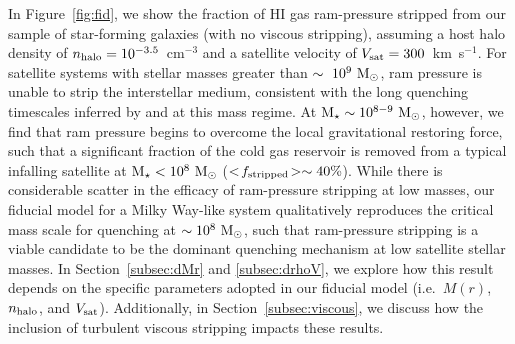 In Figure~\ref{fig:fid}, we show the fraction of H{\scriptsize I} gas
ram-pressure stripped from our sample of star-forming galaxies (with
no viscous stripping), assuming a host halo density of $n_{\rm halo} =
10^{-3.5}$~cm$^{-3}$ and a satellite velocity of $V_{\rm sat} =
300$~km~s$^{-1}$.
%
For satellite systems with stellar masses greater than
$\sim~10^{9}~{\rm M}_{\odot}$, ram pressure is unable to strip the interstellar
medium, consistent with the long quenching timescales inferred by
\citet{wheeler14} and \citet{fham15} at this mass regime.
% 
At ${\rm M}_{\star} \sim 10^{8-9}~{\rm M}_{\odot}$, however, we find that ram pressure
begins to overcome the local gravitational restoring force, such that
a significant fraction of the cold gas reservoir is removed from a
typical infalling satellite at ${\rm M}_{\star} < 10^{8}~{\rm M}_{\odot}$ ($<\!f_{\rm
  stripped}\!> \sim 40\%$).
%
While there is considerable scatter in the efficacy of ram-pressure
stripping at low masses, our fiducial model for a Milky Way-like
system qualitatively reproduces the critical mass scale for quenching
at $\sim10^{8}~{\rm M}_{\odot}$, such that ram-pressure stripping is a viable
candidate to be the dominant quenching mechanism at low satellite
stellar masses.
%
In Section~\ref{subsec:dMr} and \ref{subsec:drhoV}, we explore how
this result depends on the specific parameters adopted in our fiducial
model (i.e.~$M(r)$, $n_{\rm halo}$, and $V_{\rm sat}$). Additionally,
in Section~\ref{subsec:viscous}, we discuss how the inclusion of
turbulent viscous stripping impacts these results.


